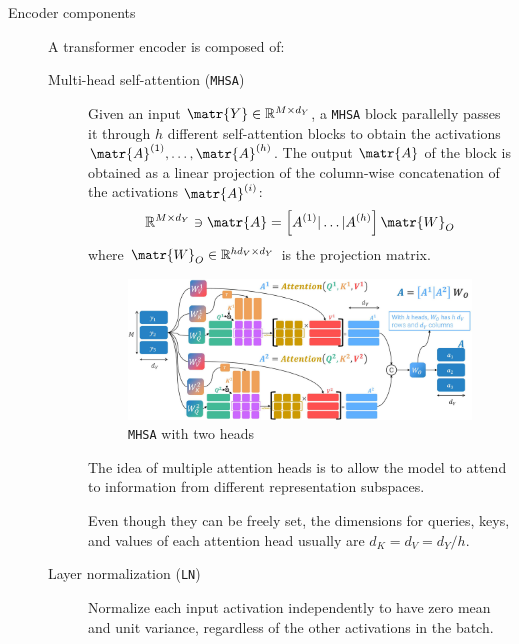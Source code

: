 \begin{description}
    \item[Encoder components]
        A transformer encoder is composed of:

        \begin{description}
            \item[Multi-head self-attention (\texttt{MHSA})] 
                Given an input $\matr{Y} \in \mathbb{R}^{M \times d_Y}$, a \texttt{MHSA} block parallelly passes it through $h$ different self-attention blocks to obtain the activations $\matr{A}^{(1)}, \dots, \matr{A}^{(h)}$. The output $\matr{A}$ of the block is obtained as a linear projection of the column-wise concatenation of the activations $\matr{A}^{(i)}$:
                \[ \mathbb{R}^{M \times d_Y} \ni \matr{A} = \left[ A^{(1)} \vert \dots \vert A^{(h)} \right] \matr{W}_O \]
                where $\matr{W}_O \in \mathbb{R}^{hd_V \times d_Y}$ is the projection matrix.

                \begin{figure}[H]
                    \centering
                    \includegraphics[width=0.7\linewidth]{./img/_multi_head_attention.jpg}
                    \caption{\texttt{MHSA} with two heads}
                \end{figure}

                \begin{remark}
                    The idea of multiple attention heads is to allow the model to attend to information from different representation subspaces.
                \end{remark}

                \begin{remark}
                    Even though they can be freely set, the dimensions for queries, keys, and values of each attention head usually are $d_K = d_V = d_Y/h$.
                \end{remark}

            \item[Layer normalization (\texttt{LN})] 
                Normalize each input activation independently to have zero mean and unit variance, regardless of the other activations in the batch.


\end{description}
\end{description}
